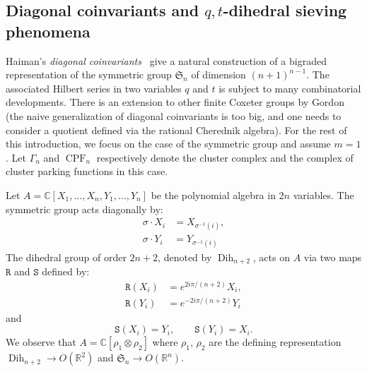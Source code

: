 \documentclass[11pt]{article}
\theoremstyle{definition}
\DeclareMathOperator{\dih}{Dih}
\newcommand{\RRRR}{\mathtt{R}}
\newcommand{\SSSS}{\mathtt{S}}
\DeclareMathOperator{\CPF}{CPF}
\begin{document}
\subsection{\texorpdfstring{Diagonal coinvariants and $q,t$-dihedral sieving phenomena}{Diagonal coinvariants and q,t-dihedral sieving phenomena}}
\label{sec:introdihedral}

Haiman's {\it diagonal coinvariants}~\cite{haiman} give a natural construction of a bigraded representation of the symmetric group $\mathfrak{S}_n$ of dimension $(n+1)^{n-1}$.  The associated Hilbert series in two variables $q$ and $t$ is subject to many combinatorial developments. %
There is an extension to other finite Coxeter groups by Gordon~\cite{gordon} (the naive generalization of diagonal coinvariants is too big, and one needs to consider a quotient defined via the rational Cherednik algebra).  For the rest of this introduction, we focus on the case of the symmetric group and assume $m=1$.  Let $\Gamma_n$ and $\CPF_n$  respectively denote the cluster complex and the complex of cluster parking functions in this case.

Let $A = \mathbb{C}[X_1,\dots,X_n, Y_1,\dots,Y_n]$ be the polynomial algebra in $2n$ variables.  The symmetric group acts diagonally by:
\begin{align*}
    \sigma \cdot X_i &= X_{\sigma^{-1}(i)}, \\
    \sigma \cdot Y_i &= Y_{\sigma^{-1}(i)}
\end{align*}
The dihedral group of order $2n+2$, denoted by $\dih_{n+2}$, acts on $A$ via two maps $\RRRR$ and $\SSSS$ defined by:
\begin{align} \label{eq:defRRRR}
    \RRRR( X_i )  &=  e^{2i\pi / (n+2)} X_i, \\
    \RRRR( Y_i )  &=  e^{- 2i\pi / (n+2)} Y_i
\end{align}
and
\[
    \SSSS(X_i) = Y_i, \qquad \SSSS(Y_i) = X_i.
\]
We observe that $A = \mathbb{C}[\rho_1\otimes\rho_2]$ where $\rho_1$, $\rho_2$ are the defining representation $\dih_{n+2}\to O(\mathbb{R}^2)$ and $\mathfrak{S}_n \to O(\mathbb{R}^n)$.
\end{document}
